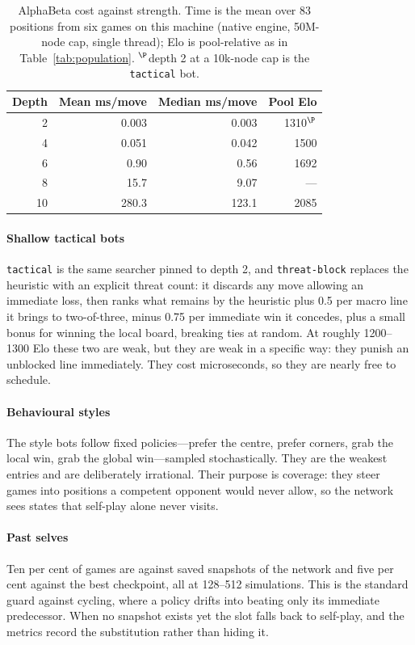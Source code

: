 \documentclass[conference]{IEEEtran}
\newcommand{\code}[1]{\texttt{#1}}
\begin{document}
\begin{table}[t]
  \centering\footnotesize
  \caption{AlphaBeta cost against strength. Time is the mean over 83
  positions from six games on this machine (native engine, 50M-node cap,
  single thread); Elo is pool-relative as in Table~\ref{tab:population}.
  $^\P$depth 2 at a 10k-node cap is the \code{tactical} bot.}
  \label{tab:depth}
  \setlength{\tabcolsep}{5pt}
  \begin{tabular}{@{}rrrr@{}}
    \toprule
    Depth & Mean ms/move & Median ms/move & Pool Elo \\
    \midrule
    2 & 0.003 & 0.003 & 1310$^\P$ \\
    4 & 0.051 & 0.042 & 1500 \\
    6 & 0.90 & 0.56 & 1692 \\
    8 & 15.7 & 9.07 & --- \\
    10 & 280.3 & 123.1 & 2085 \\
    \bottomrule
  \end{tabular}
\end{table}

\paragraph{Shallow tactical bots}
\code{tactical} is the same searcher pinned to depth 2, and
\code{threat-block} replaces the heuristic with an explicit threat count: it
discards any move allowing an immediate loss, then ranks what remains by the
heuristic plus 0.5 per macro line it brings to two-of-three, minus 0.75 per
immediate win it concedes, plus a small bonus for winning the local board,
breaking ties at random. At roughly 1200--1300 Elo these two are weak, but
they are weak in a specific way: they punish an unblocked line immediately.
They cost microseconds, so they are nearly free to schedule.

\paragraph{Behavioural styles}
The style bots follow fixed policies---prefer the centre, prefer corners,
grab the local win, grab the global win---sampled stochastically. They are
the weakest entries and are deliberately irrational. Their purpose is
coverage: they steer games into positions a competent opponent would never
allow, so the network sees states that self-play alone never visits.

\paragraph{Past selves}
Ten per cent of games are against saved snapshots of the network and five
per cent against the best checkpoint, all at 128--512 simulations. This is
the standard guard against cycling, where a policy drifts into beating only
its immediate predecessor. When no snapshot exists yet the slot falls back
to self-play, and the metrics record the substitution rather than hiding it.
\end{document}
